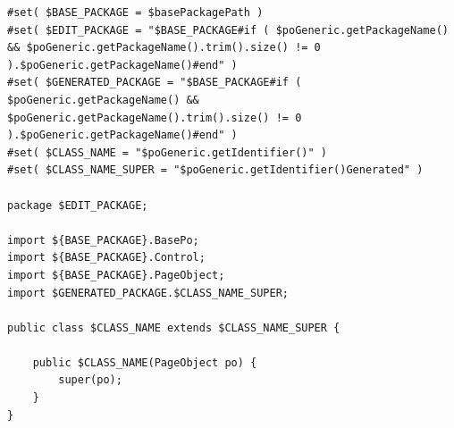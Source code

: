 \begin{lstlisting}[caption={poEditable.vm},label={lst:template_poeditable}]
#set( $BASE_PACKAGE = $basePackagePath )
#set( $EDIT_PACKAGE = "$BASE_PACKAGE#if ( $poGeneric.getPackageName() && $poGeneric.getPackageName().trim().size() != 0 ).$poGeneric.getPackageName()#end" )
#set( $GENERATED_PACKAGE = "$BASE_PACKAGE#if ( $poGeneric.getPackageName() && $poGeneric.getPackageName().trim().size() != 0 ).$poGeneric.getPackageName()#end" )
#set( $CLASS_NAME = "$poGeneric.getIdentifier()" )
#set( $CLASS_NAME_SUPER = "$poGeneric.getIdentifier()Generated" )

package $EDIT_PACKAGE;

import ${BASE_PACKAGE}.BasePo;
import ${BASE_PACKAGE}.Control;
import ${BASE_PACKAGE}.PageObject;
import $GENERATED_PACKAGE.$CLASS_NAME_SUPER;

public class $CLASS_NAME extends $CLASS_NAME_SUPER {

	public $CLASS_NAME(PageObject po) {
		super(po);
	}
}
\end{lstlisting} 
